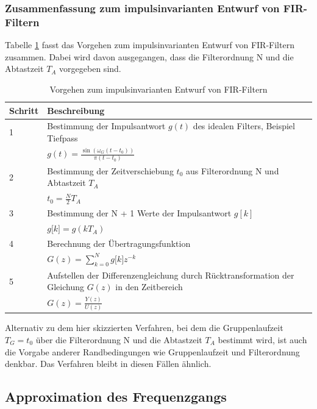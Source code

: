 \subsubsection{Zusammenfassung zum impulsinvarianten Entwurf von FIR-Filtern}\label{sec:zusammenfassung-zum-impulsinvarianten-entwurf-von-fir-filtern}

Tabelle \ref{tab:9.6} fasst das Vorgehen zum impulsinvarianten Entwurf von FIR-Filtern zusammen. Dabei wird davon ausgegangen, dass die Filterordnung N und die Abtastzeit \(T_{A}\) vorgegeben sind.

\begin{table}
  \centering
  \caption{Vorgehen zum impulsinvarianten Entwurf von FIR-Filtern}
  \label{tab:9.6}
  \begin{tabular}{ll}
    \toprule
    Schritt & Beschreibung \\
    \midrule
    1 & Bestimmung der Impulsantwort \(g(t)\) des idealen Filters, Beispiel Tiefpass \\
    & \(g(t) = \frac{\sin\left( \omega_{G}  \left( t - t_{0} \right) \right)}{\pi  \left( t - t_{0} \right)}\) \\
    2 & Bestimmung der Zeitverschiebung \(t_{0}\) aus Filterordnung N und Abtastzeit \(T_{A}\) \\
    & \(t_{0} = \frac{N}{2}  T_{A}\) \\
    3 & Bestimmung der N + 1 Werte der Impulsantwort \(g[k]\) \\
    & \(g\lbrack k\rbrack = g\left( k  T_{A} \right)\) \\
    4 & Berechnung der Übertragungsfunktion \\
    & \(G(z) = \sum\limits_{k = 0}^{N}{g\lbrack k\rbrack  z^{- k}}\) \\
    5 & Aufstellen der Differenzengleichung durch Rücktransformation der Gleichung \(G(z)\) in den Zeitbereich \\
    & \(G(z) = \frac{Y(z)}{U(z)}\) \\
    \bottomrule
  \end{tabular}
\end{table}

Alternativ zu dem hier skizzierten Verfahren, bei dem die Gruppenlaufzeit \(T_{G} = t_{0}\) über die Filterordnung N und die Abtastzeit \(T_{A}\) bestimmt wird, ist auch die Vorgabe anderer Randbedingungen wie Gruppenlaufzeit und Filterordnung denkbar. Das Verfahren bleibt in diesen Fällen ähnlich.

\subsection{Approximation des Frequenzgangs}\label{sec:approximation-des-frequenzgangs}

